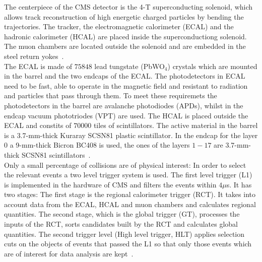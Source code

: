 The centerpiece of the CMS detector is the 4-T superconducting solenoid, which allows track reconstruction of high energetic charged particles by bending the trajectories. The tracker,
the electromagnetic calorimeter (ECAL) and the hadronic calorimeter (HCAL) are placed inside the superconductiong solenoid. The muon chambers are located outside the solenoid and are embedded in the steel return yokes~\cite{CMS:2008}. \\

The ECAL is made of $75 848$ lead tungstate (PbWO$_4$) crystals which are mounted in the barrel and the two endcaps of the ECAL. The photodetectors in ECAL need to be fast, able to operate in the magnetic field and
resistant to radiation and particles that pass through them. To meet these requiremets the photodetectors in the barrel are avalanche photodiodes (APDs), whilst in the endcap vacuum phototriodes (VPT) are used.
The HCAL is placed outside the ECAL and constits of $70 000$ tiles of scintillators. The active material in the barrel is a 3.7-mm-thick Kuraray SCSN81 plastic scintillator. 
In the endcap for the layer $0$ a 9-mm-thick Bicron BC408 is used, the ones of the layers $1-17$ are 3.7-mm-thick SCSN81 scintillators~\cite{CMS:2008}.\\

Only a small percentage of collisions are of physical interest: In order to select the relevant events a two level trigger system is used. The first level trigger (L1) is implemented in the hardware of CMS and filters the events
within $4 \mu$s. It has two stages: The first stage is the regional calorimeter trigger (RCT). It takes into account data from the ECAL, HCAL and muon chambers and calculates regional quantities. The second stage, which is the global trigger (GT), processes the inputs of the RCT,
sorts candidates built by the RCT and calculates global quantities. The second trigger level (High level trigger, HLT) applies selection cuts on the objects of events that passed the L1 so that only those events which
are of interest for data analysis are kept~\cite{CMS:2017trg}. \\

